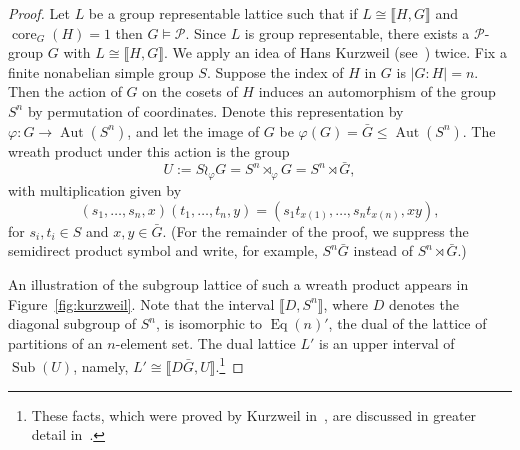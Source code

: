 \documentclass{gen-j-l}
\newcommand{\lb}{\ensuremath{\llbracket}}
\newcommand{\rb}{\ensuremath{\rrbracket}}
\newcommand{\<}{\ensuremath{\langle}}
\renewcommand{\>}{\ensuremath{\rangle}}
\theoremstyle{plain}
\theoremstyle{definition}
\theoremstyle{remark}
\numberwithin{theorem}{section}
\numberwithin{claim}{section}
\numberwithin{equation}{section}
\numberwithin{conjecture}{section}
\renewcommand{\leq}{\ensuremath{\leqslant}}
\newcommand{\Aut}{\ensuremath{\operatorname{Aut}}}
\newcommand{\Eq}{\ensuremath{\operatorname{Eq}}}
\newcommand{\Sub}{\ensuremath{\operatorname{Sub}}}
\newcommand{\core}{\ensuremath{\operatorname{core}}}
\newcommand{\2}{\ensuremath{\mathbf{2}}}
\newcommand{\3}{\ensuremath{\mathbf{3}}}
\newcommand{\cP}{\ensuremath{\mathcal{P}}}
\renewcommand{\phi}{\ensuremath{\varphi}}
\begin{document}
\begin{proof}
  Let $L$ be a group representable lattice such that if $L\cong \lb H,G \rb$ and
  $\core_G(H)=1$ then $G\vDash \cP$.
  Since $L$ is group representable, there exists a $\cP$-group $G$ with $L
  \cong \lb H,G \rb$. 
  We apply an idea of Hans Kurzweil (see~\cite{Kurzweil:1985}) twice.
Fix a finite nonabelian simple
  group $S$. Suppose the index of $H$ in $G$ is $|G:H| = n$.
  Then the action of $G$ on the cosets of $H$ induces an automorphism of the
  group $S^n$ by permutation of coordinates.  Denote this representation by
  $\phi: G \rightarrow \Aut(S^n)$, 
  and let the image of $G$ be $\phi(G) =
  \bar{G} \leq \Aut(S^n)$.  
  The wreath product under this action is the group
  \[
  U:= S\wr_\phi G = S^n \rtimes_\phi G = S^n \rtimes \bar{G}, %
  \]
  with multiplication given by
  \[
  (s_1, \dots, s_n, x) (t_1, \dots, t_n, y) = 
  (s_1 t_{x(1)}, \dots, s_nt_{x(n)}, x y),
  \]
  for $s_i, t_i \in S$ and $x, y \in \bar{G}$.  (For the remainder of the proof,
  we suppress the semidirect product symbol and write, for example, $S^n\bar{G}$
  instead of $S^n \rtimes \bar{G}$.)

  An illustration of the subgroup lattice of such a wreath product appears in
  Figure~\ref{fig:kurzweil}.  Note that the interval
  $\lb D, S^n \rb$, where $D$ denotes the diagonal subgroup of
  $S^n$, is isomorphic to $\Eq(n)'$, the dual of the lattice of partitions of an
  $n$-element set.
  The dual lattice $L'$ is an upper interval of $\Sub(U)$, namely,
  $L'\cong \lb D\bar{G}, U \rb$.\footnote{These facts, which were proved by Kurzweil
    in~\cite{Kurzweil:1985}, are discussed in greater detail in~\cite[Section 2.2]{DeMeo:thesis}.} 


\end{proof}
\end{document}
